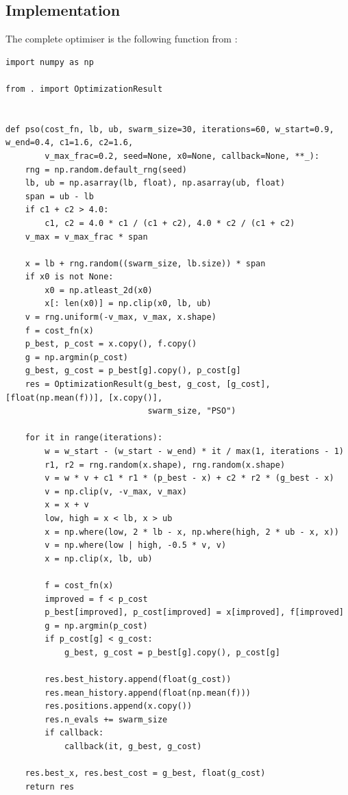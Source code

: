 \documentclass[11pt,a4paper]{article}
\begin{document}
\subsection{Implementation}

The complete optimiser is the following function from :
\begin{lstlisting}[style=py]
import numpy as np

from . import OptimizationResult


def pso(cost_fn, lb, ub, swarm_size=30, iterations=60, w_start=0.9, w_end=0.4, c1=1.6, c2=1.6,
        v_max_frac=0.2, seed=None, x0=None, callback=None, **_):
    rng = np.random.default_rng(seed)
    lb, ub = np.asarray(lb, float), np.asarray(ub, float)
    span = ub - lb
    if c1 + c2 > 4.0:
        c1, c2 = 4.0 * c1 / (c1 + c2), 4.0 * c2 / (c1 + c2)
    v_max = v_max_frac * span

    x = lb + rng.random((swarm_size, lb.size)) * span
    if x0 is not None:
        x0 = np.atleast_2d(x0)
        x[: len(x0)] = np.clip(x0, lb, ub)
    v = rng.uniform(-v_max, v_max, x.shape)
    f = cost_fn(x)
    p_best, p_cost = x.copy(), f.copy()
    g = np.argmin(p_cost)
    g_best, g_cost = p_best[g].copy(), p_cost[g]
    res = OptimizationResult(g_best, g_cost, [g_cost], [float(np.mean(f))], [x.copy()],
                             swarm_size, "PSO")

    for it in range(iterations):
        w = w_start - (w_start - w_end) * it / max(1, iterations - 1)
        r1, r2 = rng.random(x.shape), rng.random(x.shape)
        v = w * v + c1 * r1 * (p_best - x) + c2 * r2 * (g_best - x)
        v = np.clip(v, -v_max, v_max)
        x = x + v
        low, high = x < lb, x > ub
        x = np.where(low, 2 * lb - x, np.where(high, 2 * ub - x, x))
        v = np.where(low | high, -0.5 * v, v)
        x = np.clip(x, lb, ub)

        f = cost_fn(x)
        improved = f < p_cost
        p_best[improved], p_cost[improved] = x[improved], f[improved]
        g = np.argmin(p_cost)
        if p_cost[g] < g_cost:
            g_best, g_cost = p_best[g].copy(), p_cost[g]

        res.best_history.append(float(g_cost))
        res.mean_history.append(float(np.mean(f)))
        res.positions.append(x.copy())
        res.n_evals += swarm_size
        if callback:
            callback(it, g_best, g_cost)

    res.best_x, res.best_cost = g_best, float(g_cost)
    return res
\end{lstlisting}
\end{document}
